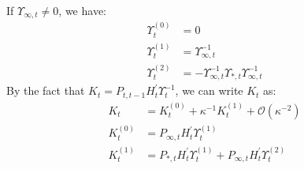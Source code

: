 \documentclass[12pt]{article}
\numberwithin{equation}{section}
\begin{document}
If $\Upsilon_{\infty,t}\neq 0$, we have:
\begin{align*}
    \Upsilon_t^{(0)} &= 0 \\
    \Upsilon_t^{(1)} &= \Upsilon_{\infty,t}^{-1} \\
    \Upsilon_t^{(2)} &= -\Upsilon_{\infty,t}^{-1}\Upsilon_{*,t}\Upsilon_{\infty,t}^{-1}
\end{align*}
By the fact that $K_t = P_{t,t-1}H_t^{'}\Upsilon_t^{-1}$, we can write $K_t$ as:
\begin{align}
    K_t &= K_t^{(0)} + \kappa^{-1}K_t^{(1)} + \mathcal{O}(\kappa^{-2}) \label{eq:K1_diffuse_start} \\
    K_t^{(0)} &= P_{\infty,t}H_t^{'}\Upsilon_t^{(1)} \\
    K_t^{(1)} &= P_{*,t}H_t^{'}\Upsilon_t^{(1)} + P_{\infty,t}H_t^{'}\Upsilon_t^{(2)} \label{eq:K1_diffuse_end}
\end{align}
\end{document}
